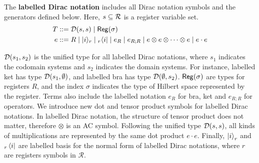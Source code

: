 
\begin{definition}
  The \textbf{labelled Dirac notation} includes all Dirac notation symbols and the generators defined below.
  Here, $s\subseteq \mathcal{R}$ is a register variable set.
  \begin{align*}
    T & ::= \mathcal{D}(s,s) \mid \mathsf{Reg}(\sigma) \\
    e & ::= R \mid |i\rangle_r \mid {}_r\langle i| \mid e_R \mid e_{R;R} \mid
    e \otimes e \otimes \cdots \otimes e \mid e \cdot e
  \end{align*}
\end{definition}
$\mathcal{D}(s_1, s_2)$ is the unified type for all labelled Dirac notations, where $s_1$ indicates the codomain systems and $s_2$ indicates the domain systems. For instance, labelled ket has type $\mathcal{D}(s_1, \emptyset)$, and labelled bra has type $\mathcal{D}(\emptyset, s_2)$.
$\mathsf{Reg}(\sigma)$ are types for registers $R$, and the index $\sigma$ indicates the type of Hilbert space represented by the register.
Terms also include the labelled notation $e_R$ for bra, ket and $e_{R;R}$ for operators. We introduce new dot and tensor product symbols for labelled Dirac notations. In labelled Dirac notation, the structure of tensor product does not matter, therefore $\otimes$ is an AC symbol.
Following the unified type $\mathcal{D}(s,s)$, all kinds of multiplications are represented by the same dot product $e \cdot e$.
Finally, $\ket{i}_r$ and ${}_r\bra{i}$ are labelled basis for the normal form of labelled Dirac notations, where $r$ are registers symbols in $\mathcal{R}$. 

